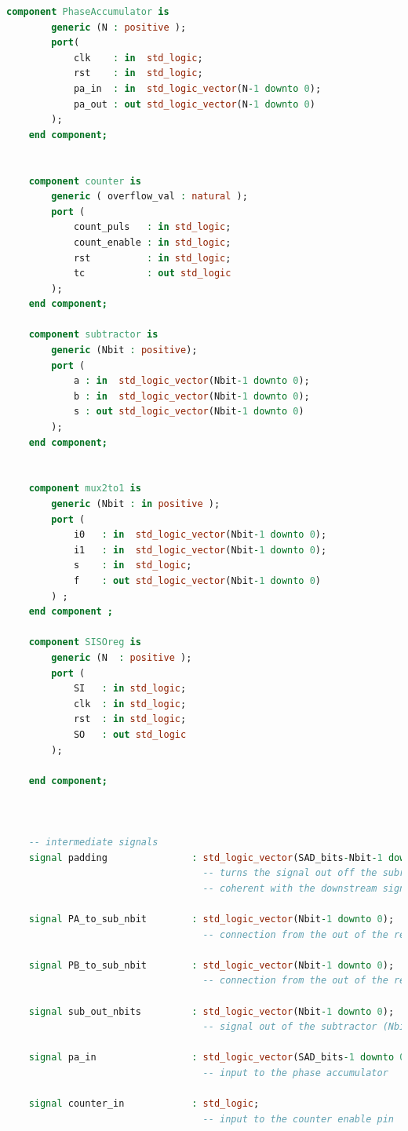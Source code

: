\documentclass[12pt, a4paper]{article}
\begin{document}
\begin{appendices}
\begin{lstlisting}[language=vhdl]
	component PhaseAccumulator is
		generic (N : positive );
		port(
			clk    : in  std_logic;
			rst    : in  std_logic;
			pa_in  : in  std_logic_vector(N-1 downto 0);
			pa_out : out std_logic_vector(N-1 downto 0)
		);
	end component;


	component counter is
		generic ( overflow_val : natural );
		port (
			count_puls   : in std_logic;
			count_enable : in std_logic;
			rst          : in std_logic;
			tc           : out std_logic
		);
	end component;

	component subtractor is
		generic (Nbit : positive);
		port (
			a : in  std_logic_vector(Nbit-1 downto 0);
			b : in  std_logic_vector(Nbit-1 downto 0);
			s : out std_logic_vector(Nbit-1 downto 0) 
		);
	end component;


	component mux2to1 is
		generic (Nbit : in positive );
		port (
			i0   : in  std_logic_vector(Nbit-1 downto 0);
			i1   : in  std_logic_vector(Nbit-1 downto 0);
			s    : in  std_logic;
			f    : out std_logic_vector(Nbit-1 downto 0)
		) ;
	end component ;

	component SISOreg is
		generic (N  : positive );
		port (
			SI   : in std_logic;
			clk  : in std_logic;
			rst  : in std_logic;
			SO   : out std_logic
		);

	end component;



	-- intermediate signals
	signal padding               : std_logic_vector(SAD_bits-Nbit-1 downto 0); 
                                   -- turns the signal out off the subractor to a number of bits 
                                   -- coherent with the downstream signal

	signal PA_to_sub_nbit        : std_logic_vector(Nbit-1 downto 0);          
                                   -- connection from the out of the reg on the PA side to the subtractor

	signal PB_to_sub_nbit        : std_logic_vector(Nbit-1 downto 0);          
                                   -- connection from the out of the reg on the PB side to the subtractor

	signal sub_out_nbits         : std_logic_vector(Nbit-1 downto 0); 
                                   -- signal out of the subtractor (Nbit)

	signal pa_in                 : std_logic_vector(SAD_bits-1 downto 0);
                                   -- input to the phase accumulator
	
	signal counter_in            : std_logic; 
                                   -- input to the counter enable pin


\end{lstlisting}
\end{appendices}
\end{document}
